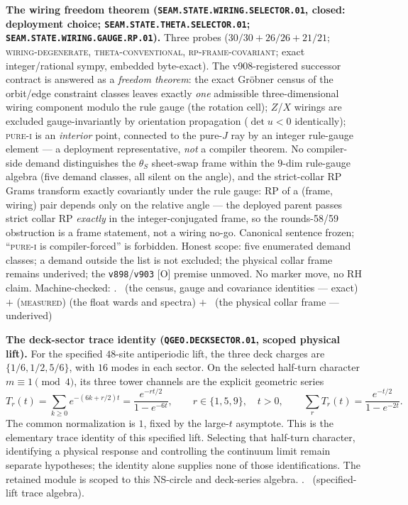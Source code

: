 \par\smallskip\noindent\textbf{The wiring freedom theorem
(\texttt{SEAM.STATE.WIRING.\allowbreak SELECTOR.01}, closed:
deployment choice;
\texttt{SEAM.STATE.THETA.\allowbreak SELECTOR.01};
\texttt{SEAM.STATE.WIRING.\allowbreak GAUGE.RP.01}).}
Three probes ($30/30 + 26/26 + 21/21$;
\textsc{wiring-degenerate}, \textsc{theta-conventional},
\textsc{rp-frame-covariant}; exact integer/rational sympy,
embedded byte-exact).  The v908-registered successor contract
is answered as a \emph{freedom theorem}: the exact Gr\"obner
census of the orbit/edge constraint classes leaves exactly
\emph{one} admissible three-dimensional wiring component modulo
the rule gauge (the rotation cell); $Z$/$X$ wirings are
excluded gauge-invariantly by orientation propagation
($\det u < 0$ identically); \textsc{pure-i} is an
\emph{interior} point, connected to the pure-$J$ ray by an
integer rule-gauge element --- a deployment representative,
\emph{not} a compiler theorem.  No compiler-side demand
distinguishes the $\theta_S$ sheet-swap frame within the
$9$-dim rule-gauge algebra (five demand classes, all silent on
the angle), and the strict-collar RP Grams transform exactly
covariantly under the rule gauge: RP of a (frame, wiring) pair
depends only on the relative angle --- the deployed parent
passes strict collar RP \emph{exactly} in the
integer-conjugated frame, so the rounds-58/59 obstruction is a
frame statement, not a wiring no-go.  Canonical sentence
frozen; ``\textsc{pure-i} is compiler-forced'' is forbidden.
Honest scope: five enumerated demand classes; a demand outside
the list is not excluded; the physical collar frame remains
underived; the \texttt{v898}/\texttt{v903} [O] premise
unmoved.  No marker move, no RH claim.
Machine-checked: .
\mE\ (the census, gauge and covariance identities --- exact)
$+$ (\textsc{measured}) (the float wards and spectra) $+$
\mO\ (the physical collar frame --- underived)
\par\smallskip

\par\smallskip\noindent\textbf{The deck-sector trace identity
(\texttt{QGEO.DECKSECTOR.01}, scoped physical lift).}
For the specified $48$-site antiperiodic lift, the three deck charges are
$\{1/6,1/2,5/6\}$, with $16$ modes in each sector.  On the selected
half-turn character $m\equiv1\pmod4$, its three tower channels are the
explicit geometric series
\[
 T_r(t)=\sum_{k\ge0}e^{-(6k+r/2)t}
       =\frac{e^{-rt/2}}{1-e^{-6t}},\qquad r\in\{1,5,9\},\quad t>0,
 \qquad\sum_rT_r(t)=\frac{e^{-t/2}}{1-e^{-2t}}.
\]
The common normalization is $1$, fixed by the large-$t$ asymptote.
This is the elementary trace identity of this specified lift.  Selecting
that half-turn character, identifying a physical response and controlling
the continuum limit remain separate hypotheses; the identity alone supplies
none of those identifications.  The retained module is scoped to this
NS-circle and deck-series algebra.
. \mE\ (specified-lift trace algebra).
\par\smallskip

